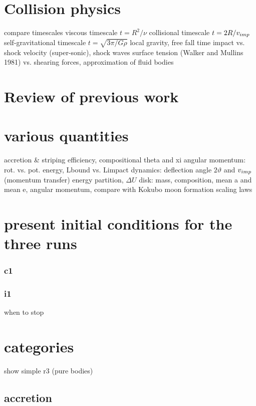 
\section{Collision physics}
compare timescales
viscous timescale $t = R^2 / \nu$
collisional timescale $t = 2 R / v_{imp}$
self-gravitational timescale $t = \sqrt{3\pi / G \rho}$
local gravity, free fall time
impact vs. shock velocity (super-sonic), shock waves
surface tension (Walker and Mullins 1981) vs. shearing forces, approximation of fluid bodies

\section{Review of previous work}


\section{various quantities}
accretion \& striping efficiency, compositional theta and xi
angular momentum: rot. vs. pot. energy, Lbound vs. Limpact
dynamics: deflection angle $2 \vartheta$ and $v_{imp}$ (momentum transfer)
energy partition, $\Delta U$
disk: mass, composition, mean a and mean e, angular momentum, compare with Kokubo moon formation scaling laws


\section{present initial conditions for the three runs}
\subsubsection{c1}
\subsubsection{i1}
when to stop

\section{\SSC categories}
show simple r3 (pure bodies)


\subsection{accretion}
